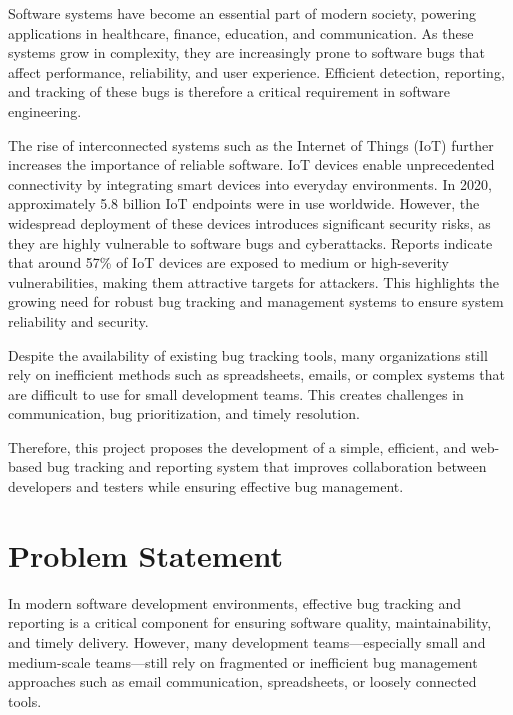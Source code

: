 \documentclass[12pt]{article}
\begin{document}
Software systems have become an essential part of modern society, powering applications in healthcare, finance, education, and communication. As these systems grow in complexity, they are increasingly prone to software bugs that affect performance, reliability, and user experience. Efficient detection, reporting, and tracking of these bugs is therefore a critical requirement in software engineering.

The rise of interconnected systems such as the Internet of Things (IoT) further increases the importance of reliable software. IoT devices enable unprecedented connectivity by integrating smart devices into everyday environments. In 2020, approximately 5.8 billion IoT endpoints were in use worldwide. However, the widespread deployment of these devices introduces significant security risks, as they are highly vulnerable to software bugs and cyberattacks. Reports indicate that around 57\% of IoT devices are exposed to medium or high-severity vulnerabilities, making them attractive targets for attackers. This highlights the growing need for robust bug tracking and management systems to ensure system reliability and security.

Despite the availability of existing bug tracking tools, many organizations still rely on inefficient methods such as spreadsheets, emails, or complex systems that are difficult to use for small development teams. This creates challenges in communication, bug prioritization, and timely resolution.

Therefore, this project proposes the development of a simple, efficient, and web-based bug tracking and reporting system that improves collaboration between developers and testers while ensuring effective bug management.


\section{Problem Statement}

In modern software development environments, effective bug tracking and reporting is a critical component for ensuring software quality, maintainability, and timely delivery. However, many development teams—especially small and medium-scale teams—still rely on fragmented or inefficient bug management approaches such as email communication, spreadsheets, or loosely connected tools.
\end{document}

